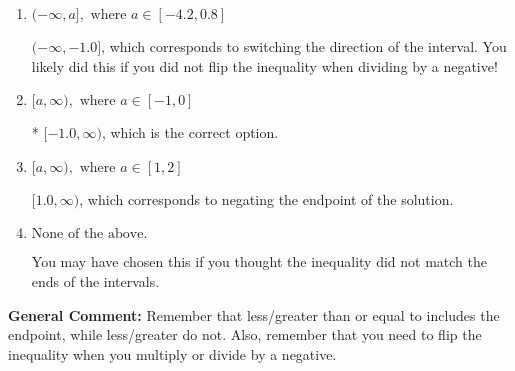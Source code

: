 \documentclass{extbook}[14pt]
\begin{document}
\begin{enumerate}
{\begin{enumerate}[label=\Alph*.]
 $(-\infty, 1.0]$, which corresponds to switching the direction of the interval AND negating the endpoint. You likely did this if you did not flip the inequality when dividing by a negative as well as not moving values over to a side properly.
\item \( (-\infty, a], \text{ where } a \in [-4.2, 0.8] \)

 $(-\infty, -1.0]$, which corresponds to switching the direction of the interval. You likely did this if you did not flip the inequality when dividing by a negative!
\item \( [a, \infty), \text{ where } a \in [-1, 0] \)

* $[-1.0, \infty)$, which is the correct option.
\item \( [a, \infty), \text{ where } a \in [1, 2] \)

 $[1.0, \infty)$, which corresponds to negating the endpoint of the solution.
\item \( \text{None of the above}. \)

You may have chosen this if you thought the inequality did not match the ends of the intervals.
\end{enumerate}

\textbf{General Comment:} Remember that less/greater than or equal to includes the endpoint, while less/greater do not. Also, remember that you need to flip the inequality when you multiply or divide by a negative.
}
\end{enumerate}
\end{document}
